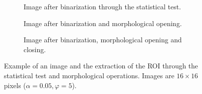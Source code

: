 \begin{figure}[H]
\begin{subfigure}[t]{0.48\linewidth}
		\caption{Image after binarization through the statistical test.}
		\label{fig: exampleI}
	\end{subfigure}
	\hfill
	\begin{subfigure}[t]{0.48\linewidth}
		\centering
		\caption{Image after binarization and morphological opening.}
		\label{fig: exampleI_o}
	\end{subfigure}
	\vfill
	\begin{subfigure}[t]{0.48\linewidth}
		\centering
		\caption{Image after binarization, morphological opening and closing.}
		\label{fig: exampleI_oc}
	\end{subfigure}
	\caption{Example of an image and the extraction of the ROI through the statistical test and morphological operations. Images are $16 \times 16$ pixels ($\alpha = 0.05, \varphi = 5$).}
	\label{fig: example}
\end{figure}